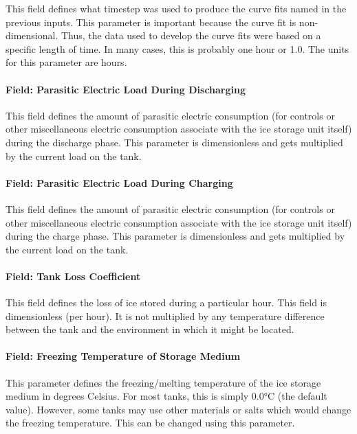 This field defines what timestep was used to produce the curve fits named in the previous inputs. This parameter is important because the curve fit is non-dimensional. Thus, the data used to develop the curve fits were based on a specific length of time. In many cases, this is probably one hour or 1.0. The units for this parameter are hours.

\paragraph{Field: Parasitic Electric Load During Discharging}\label{field-parasitic-electric-load-during-discharging}

This field defines the amount of parasitic electric consumption (for controls or other miscellaneous electric consumption associate with the ice storage unit itself) during the discharge phase. This parameter is dimensionless and gets multiplied by the current load on the tank.

\paragraph{Field: Parasitic Electric Load During Charging}\label{field-parasitic-electric-load-during-charging}

This field defines the amount of parasitic electric consumption (for controls or other miscellaneous electric consumption associate with the ice storage unit itself) during the charge phase. This parameter is dimensionless and gets multiplied by the current load on the tank.

\paragraph{Field: Tank Loss Coefficient}\label{field-tank-loss-coefficient}

This field defines the loss of ice stored during a particular hour. This field is dimensionless (per hour). It is not multiplied by any temperature difference between the tank and the environment in which it might be located.

\paragraph{Field: Freezing Temperature of Storage Medium}\label{field-freezing-temperature-of-storage-medium}

This parameter defines the freezing/melting temperature of the ice storage medium in degrees Celsius. For most tanks, this is simply 0.0°C (the default value). However, some tanks may use other materials or salts which would change the freezing temperature. This can be changed using this parameter.

